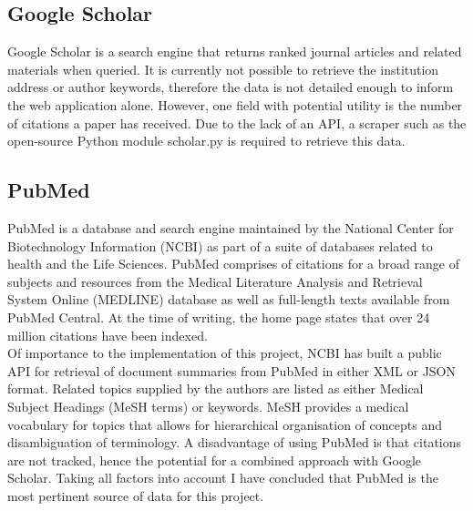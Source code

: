 \documentclass[PROP_AGutteridge_CS.tex]{subfiles}
\begin{document}
\noindent \subsection{Google Scholar}
Google Scholar is a search engine that returns ranked journal articles and related materials when queried. It is currently not possible to retrieve the institution address or author keywords, therefore the data is not detailed enough to inform the web application alone. However, one field with potential utility is the number of citations a paper has received. Due to the lack of an API, a scraper such as the open-source Python module scholar.py\cite{scholar} is required to retrieve this data.

\noindent \subsection{PubMed}
PubMed is a database and search engine maintained by the National Center for Biotechnology Information (NCBI) as part of a suite of databases related to health and the Life Sciences. PubMed comprises of citations for a broad range of subjects and resources from the Medical Literature Analysis and Retrieval System Online (MEDLINE) database as well as full-length texts available from PubMed Central. At the time of writing, the home page\cite{pubmed} states that over 24 million citations have been indexed. \\
\newline \noindent Of importance to the implementation of this project, NCBI has built a public API for retrieval of document summaries from PubMed in either XML or JSON format. Related topics supplied by the authors are listed as either Medical Subject Headings (MeSH terms) or keywords. MeSH provides a medical vocabulary for topics that allows for hierarchical organisation of concepts and disambiguation of terminology\cite{mesh}. A disadvantage of using PubMed is that citations are not tracked, hence the potential for a combined approach with Google Scholar. Taking all factors into account I have concluded that PubMed is the most pertinent source of data for this project.
\end{document}
